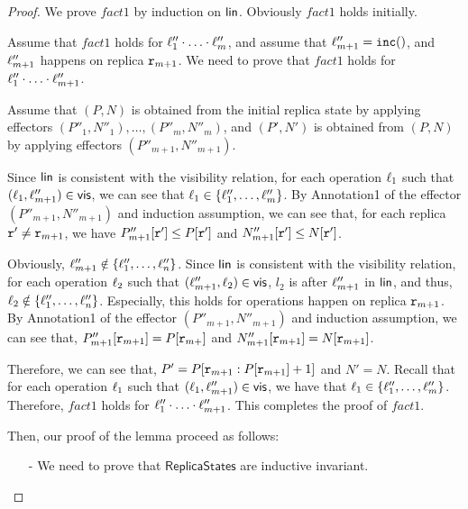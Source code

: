 \begin {proof}
We prove $fact1$ by induction on $\alinord$. Obviously $fact1$ holds initially.

Assume that $fact1$ holds for $\alabel''_1 \cdot \ldots \cdot \alabel''_m$, and assume that $\alabel''_{m+1} = \alabelshort[{\tt inc}]{}$, and $\alabel''_{m+1}$ happens on replica $\arep_{m+1}$. We need to prove that $fact1$ holds for $\alabel''_1 \cdot \ldots \cdot \alabel''_{m+1}$.

Assume that $(P,N)$ is obtained from the initial replica state by applying effectors $(P''_1,N''_1),\ldots,(P''_m,N''_m)$, and $(P',N')$ is obtained from $(P,N)$ by applying effectors $(P''_{m+1},N''_{m+1})$.

Since $\alinord$ is consistent with the visibility relation, for each operation $\alabel_1$ such that $(\alabel_1,\alabel''_{m+1}) \in \avisord$, we can see that $\alabel_1 \in \{ \alabel''_1,\dots,\alabel''_m \}$. By Annotation1 of the effector $(P''_{m+1},N''_{m+1})$ and induction assumption, we can see that, for each replica $\arep' \neq \arep_{m+1}$, we have $P''_{m+1}[\arep'] \leq P[\arep']$ and $N''_{m+1}[\arep'] \leq N[\arep']$.

Obviously, $\alabel''_{m+1} \notin \{ \alabel''_1,\ldots,\alabel''_n \}$. Since $\alinord$ is consistent with the visibility relation, for each operation $\alabel_2$ such that $(\alabel''_{m+1},\alabel_2) \in \avisord$, $l_2$ is after $\alabel''_{m+1}$ in $\alinord$, and thus, $\alabel_2 \notin \{ \alabel''_1,\ldots,\alabel''_n \}$. Especially, this holds for operations happen on replica $\arep_{m+1}$. By Annotation1 of the effector $(P''_{m+1},N''_{m+1})$ and induction assumption, we can see that, $P''_{m+1}[\arep_{m+1}] = P[\arep_{m+}]$ and $N''_{m+1}[\arep_{m+1}] = N[\arep_{m+1}]$.

Therefore, we can see that, $P' = P[\arep_{m+1}: P[\arep_{m+1}]+1]$ and $N' = N$. Recall that for each operation $\alabel_1$ such that $(\alabel_1,\alabel''_{m+1}) \in \avisord$, we have that $\alabel_1 \in \{ \alabel''_1,\dots,\alabel''_m \}$. Therefore, $fact1$ holds for $\alabel''_1 \cdot \ldots \cdot \alabel''_{m+1}$. This completes the proof of $fact1$.


Then, our proof of the lemma proceed as follows:

\begin{itemize}
\setlength{\itemsep}{0.5pt}
\item[-] We need to prove that $\mathsf{ReplicaStates}$ are inductive invariant.


\end{itemize}
\end{proof}
